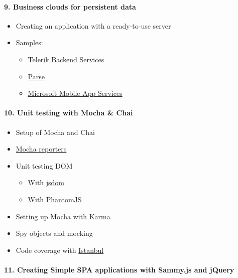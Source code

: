 \paragraph{9. Business clouds for persistent
data}\label{business-clouds-for-persistent-data}

\begin{itemize}
\tightlist
\item
  Creating an application with a ready-to-use server
\item
  Samples:

  \begin{itemize}
  \tightlist
  \item
    \href{http://www.telerik.com/backend-services}{Telerik Backend
    Services}
  \item
    \href{https://www.parse.com/}{Parse}
  \item
    \href{http://azure.microsoft.com/en-us/services/app-service/mobile/}{Microsoft
    Mobile App Services}
  \end{itemize}
\end{itemize}

\paragraph{10. Unit testing with Mocha \&
Chai}\label{unit-testing-with-mocha-chai}

\begin{itemize}
\tightlist
\item
  Setup of Mocha and Chai
\item
  \href{https://mochajs.org/\#reporters}{Mocha reporters}
\item
  Unit testing DOM

  \begin{itemize}
  \tightlist
  \item
    With \href{https://github.com/tmpvar/jsdom}{jsdom}
  \item
    With \href{http://phantomjs.org/}{PhantomJS}
  \end{itemize}
\item
  Setting up Mocha with Karma
\item
  Spy objects and mocking
\item
  Code coverage with
  \href{https://github.com/gotwarlost/istanbul}{Istanbul}
\end{itemize}

\paragraph{11. Creating Simple SPA applications with Sammy.js and
jQuery}\label{creating-simple-spa-applications-with-sammy.js-and-jquery}

